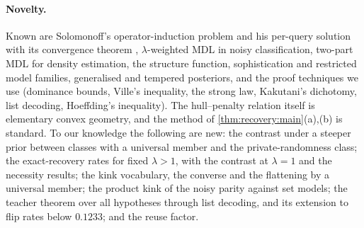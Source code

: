 \paragraph{Novelty.}\label{rem:related:new}
Known are Solomonoff's operator-induction problem and his per-query solution with its convergence theorem \citep{solomonoff2008three}, $\lambda$-weighted MDL in noisy classification, two-part MDL for density estimation, the structure function, sophistication and restricted model families, generalised and tempered posteriors, and the proof techniques we use (dominance bounds, Ville's inequality, the strong law, Kakutani's dichotomy, list decoding, Hoeffding's inequality). The hull--penalty relation itself is elementary convex geometry, and the method of \cref{thm:recovery:main}(a),(b) is standard. To our knowledge the following are new: the contrast under a steeper prior between classes with a universal member and the private-randomness class; the exact-recovery rates for fixed $\lambda>1$, with the contrast at $\lambda=1$ and the necessity results; the kink vocabulary, the converse and the flattening by a universal member; the product kink of the noisy parity against set models; the teacher theorem over all hypotheses through list decoding, and its extension to flip rates below $0.1233$; and the reuse factor.
